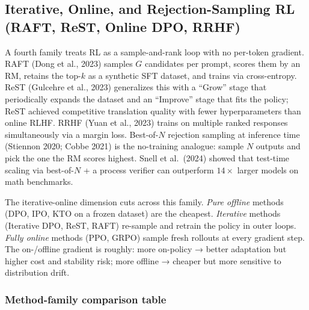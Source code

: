 \subsection{Iterative, Online, and Rejection-Sampling RL (RAFT, ReST, Online DPO, RRHF)}\label{iterative-online-and-rejection-sampling-rl-raft-rest-online-dpo-rrhf}

A fourth family treats RL as a sample-and-rank loop with no per-token gradient. RAFT (Dong et al., 2023) samples \(G\) candidates per prompt, scores them by an RM, retains the top-\(k\) as a synthetic SFT dataset, and trains via cross-entropy. ReST (Gulcehre et al., 2023) generalizes this with a ``Grow'' stage that periodically expands the dataset and an ``Improve'' stage that fits the policy; ReST achieved competitive translation quality with fewer hyperparameters than online RLHF. RRHF (Yuan et al., 2023) trains on multiple ranked responses simultaneously via a margin loss. Best-of-\(N\) rejection sampling at inference time (Stiennon 2020; Cobbe 2021) is the no-training analogue: sample \(N\) outputs and pick the one the RM scores highest. Snell et al.~(2024) showed that test-time scaling via best-of-\(N\) + a process verifier can outperform \(14\times\) larger models on math benchmarks.

The iterative-online dimension cuts across this family. \emph{Pure offline} methods (DPO, IPO, KTO on a frozen dataset) are the cheapest. \emph{Iterative} methods (Iterative DPO, ReST, RAFT) re-sample and retrain the policy in outer loops. \emph{Fully online} methods (PPO, GRPO) sample fresh rollouts at every gradient step. The on-/offline gradient is roughly: more on-policy → better adaptation but higher cost and stability risk; more offline → cheaper but more sensitive to distribution drift.

\subsubsection{Method-family comparison table}\label{method-family-comparison-table}

